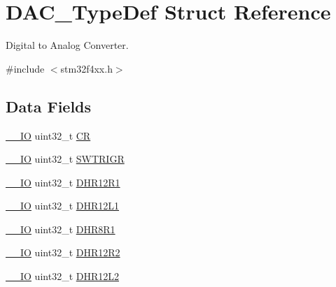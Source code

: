 \hypertarget{struct_d_a_c___type_def}{}\section{D\+A\+C\+\_\+\+Type\+Def Struct Reference}
\label{struct_d_a_c___type_def}


Digital to Analog Converter.  




{\ttfamily \#include $<$stm32f4xx.\+h$>$}

\subsection*{Data Fields}
\begin{DoxyCompactItemize}
\item 
\hyperlink{group___c_m_s_i_s__core__definitions_gaec43007d9998a0a0e01faede4133d6be}{\+\_\+\+\_\+\+IO} uint32\+\_\+t \hyperlink{struct_d_a_c___type_def_ab40c89c59391aaa9d9a8ec011dd0907a}{CR}
\item 
\hyperlink{group___c_m_s_i_s__core__definitions_gaec43007d9998a0a0e01faede4133d6be}{\+\_\+\+\_\+\+IO} uint32\+\_\+t \hyperlink{struct_d_a_c___type_def_a896bbb7153af0b67ad772360feaceeb4}{S\+W\+T\+R\+I\+GR}
\item 
\hyperlink{group___c_m_s_i_s__core__definitions_gaec43007d9998a0a0e01faede4133d6be}{\+\_\+\+\_\+\+IO} uint32\+\_\+t \hyperlink{struct_d_a_c___type_def_ac2bb55b037b800a25852736afdd7a258}{D\+H\+R12\+R1}
\item 
\hyperlink{group___c_m_s_i_s__core__definitions_gaec43007d9998a0a0e01faede4133d6be}{\+\_\+\+\_\+\+IO} uint32\+\_\+t \hyperlink{struct_d_a_c___type_def_ae9028b8bcb5118b7073165fb50fcd559}{D\+H\+R12\+L1}
\item 
\hyperlink{group___c_m_s_i_s__core__definitions_gaec43007d9998a0a0e01faede4133d6be}{\+\_\+\+\_\+\+IO} uint32\+\_\+t \hyperlink{struct_d_a_c___type_def_ad0a200e12acad17a5c7d2059159ea7e1}{D\+H\+R8\+R1}
\item 
\hyperlink{group___c_m_s_i_s__core__definitions_gaec43007d9998a0a0e01faede4133d6be}{\+\_\+\+\_\+\+IO} uint32\+\_\+t \hyperlink{struct_d_a_c___type_def_a804c7e15dbb587c7ea25511f6a7809f7}{D\+H\+R12\+R2}
\item 
\hyperlink{group___c_m_s_i_s__core__definitions_gaec43007d9998a0a0e01faede4133d6be}{\+\_\+\+\_\+\+IO} uint32\+\_\+t \hyperlink{struct_d_a_c___type_def_a2e45f9c9d67e384187b25334ba0a3e3d}{D\+H\+R12\+L2}
\item 

\end{DoxyCompactItemize}
